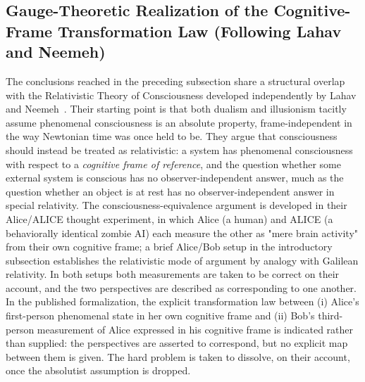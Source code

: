 \documentclass[11pt]{article}
\begin{document}
\subsection{Gauge-Theoretic Realization of the Cognitive-Frame Transformation Law (Following Lahav and Neemeh)}
\label{sec:lahav_convergence}

The conclusions reached in the preceding subsection share a structural overlap with the Relativistic Theory of Consciousness developed independently by Lahav and Neemeh~\cite{LahavNeemeh2022, LahavNeemeh2025}. Their starting point is that both dualism and illusionism tacitly assume phenomenal consciousness is an absolute property, frame-independent in the way Newtonian time was once held to be. They argue that consciousness should instead be treated as relativistic: a system has phenomenal consciousness with respect to a \emph{cognitive frame of reference}, and the question whether some external system is conscious has no observer-independent answer, much as the question whether an object is at rest has no observer-independent answer in special relativity. The consciousness-equivalence argument is developed in their Alice/ALICE thought experiment, in which Alice (a human) and ALICE (a behaviorally identical zombie AI) each measure the other as "mere brain activity" from their own cognitive frame; a brief Alice/Bob setup in the introductory subsection establishes the relativistic mode of argument by analogy with Galilean relativity. In both setups both measurements are taken to be correct on their account, and the two perspectives are described as corresponding to one another. In the published formalization, the explicit transformation law between (i) Alice's first-person phenomenal state in her own cognitive frame and (ii) Bob's third-person measurement of Alice expressed in his cognitive frame is indicated rather than supplied: the perspectives are asserted to correspond, but no explicit map between them is given. The hard problem is taken to dissolve, on their account, once the absolutist assumption is dropped.
\end{document}
